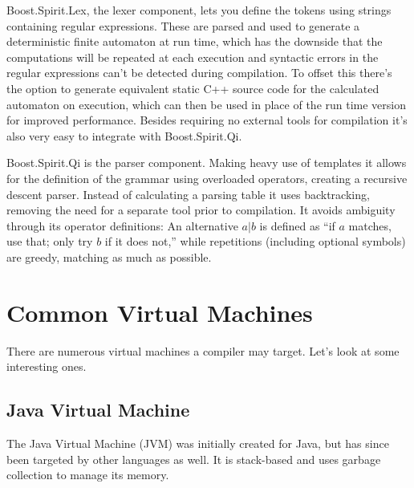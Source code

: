 			Boost.Spirit.Lex, the lexer component, lets you define the tokens using strings containing regular expressions. These are parsed and used to generate a deterministic finite automaton at run time, which has the downside that the computations will be repeated at each execution and syntactic errors in the regular expressions can't be detected during compilation. To offset this there's the option to generate equivalent static C++ source code for the calculated automaton on execution, which can then be used in place of the run time version for improved performance. Besides requiring no external tools for compilation it's also very easy to integrate with Boost.Spirit.Qi.
			
			Boost.Spirit.Qi is the parser component. Making heavy use of templates it allows for the definition of the grammar using overloaded operators, creating a recursive descent parser. Instead of calculating a parsing table it uses backtracking, removing the need for a separate tool prior to compilation. It avoids ambiguity through its operator definitions: An alternative $a|b$ is defined as ``if $a$ matches, use that; only try $b$ if it does not,'' while repetitions (including optional symbols) are greedy, matching as much as possible.

	\section{Common Virtual Machines}
		
		There are numerous virtual machines a compiler may target. Let's look at some interesting ones.
		
		
		\subsection{Java Virtual Machine}
		
			The Java Virtual Machine (JVM) was initially created for Java, but has since been targeted by other languages as well. It is stack-based and uses garbage collection to manage its memory.
			
		
			
